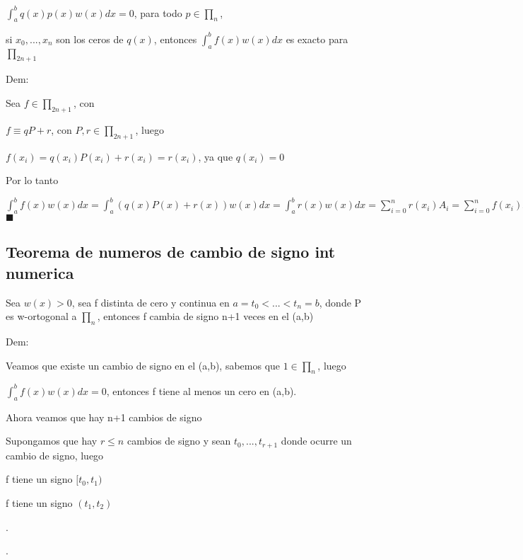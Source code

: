 \documentclass{article}
\begin{document}
$\displaystyle\int_{a}^{b}q(x)p(x)w(x)dx = 0$, para todo $p \in \prod_{n}$,

si $x_0,...,x_n$ son los ceros de $q(x)$, entonces $\displaystyle\int_{a}^{b}f(x)w(x)dx$ es exacto para $\prod_{2n+1}$

Dem:

Sea $f \in \prod_{2n+1}$, con

\vspace{5mm}

$f \equiv qP+r$, con $P,r \in \prod_{2n+1}$, luego

\vspace{5mm}

$f(x_i) = q(x_i)P(x_i)+r(x_i)=r(x_i)$, ya que $q(x_i)=0$

\vspace{5mm}

Por lo tanto

$\displaystyle\int_{a}^{b}f(x)w(x)dx=\displaystyle\int_{a}^{b}(q(x)P(x)+r(x))w(x)dx=\displaystyle\int_{a}^{b}r(x)w(x)dx=\sum\limits_{i=0}^{n}r(x_i)A_i=\sum\limits_{i=0}^{n}f(x_i)A_i$$\blacksquare$

\vspace{10mm}





\subsection{Teorema de numeros de cambio de signo int numerica}\label{T.-Auxiliar-Cuadratura-gaussiana}

Sea $w(x)>0$, sea f distinta de cero y continua en $a=t_0<...<t_n=b$, donde P es w-ortogonal a $\prod_{n}$, entonces
f cambia de signo n+1 veces en el (a,b)

Dem:

Veamos que existe un cambio de signo en el (a,b), sabemos que $1 \in \prod_{n}$, luego

$\displaystyle\int_{a}^{b} f(x)w(x)dx = 0$, entonces f tiene al menos un cero en (a,b).

Ahora veamos que hay n+1 cambios de signo

Supongamos que hay $r \leq n$ cambios de signo y sean $t_0,...,t_{r+1}$ donde ocurre un cambio de signo, luego

f tiene un signo $[t_0,t_1)$

f tiene un signo $(t_1,t_2)$

.

.
\end{document}
